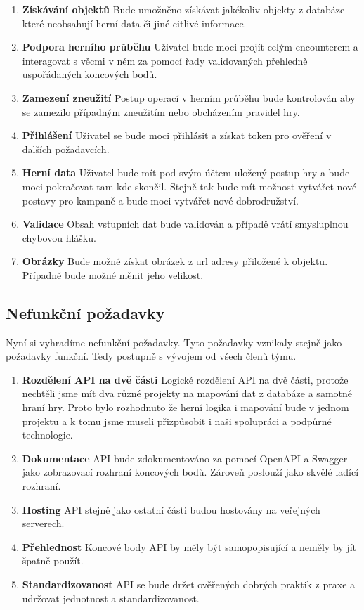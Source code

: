 \begin{enumerate}[label=\textbf{F\arabic*}:, leftmargin=*, align=left]
    \item \textbf{Získávání objektů} Bude umožněno získávat jakékoliv objekty z databáze které neobsahují herní data či jiné citlivé informace.
    \item \textbf{Podpora herního průběhu} Uživatel bude moci projít celým encounterem a interagovat s věcmi v něm za pomocí řady validovaných přehledně uspořádaných koncových bodů.
    \item \textbf{Zamezení zneužití} Postup operací v herním průběhu bude kontrolován aby se zamezilo případným zneužitím nebo obcházením pravidel hry.
    \item \textbf{Přihlášení} Uživatel se bude moci přihlásit a získat token pro ověření v dalších požadavcích.
    \item \textbf{Herní data} Uživatel bude mít pod svým účtem uložený postup hry a bude moci pokračovat tam kde skončil. Stejně tak bude mít možnost vytvářet nové postavy pro kampaně a bude moci vytvářet nové dobrodružství.
    \item \textbf{Validace} Obsah vstupních dat bude validován a případě vrátí smysluplnou chybovou hlášku.
    \item \textbf{Obrázky} Bude možné získat obrázek z url adresy přiložené k objektu. Případně bude možné měnit jeho velikost.
\end{enumerate}



\subsection{Nefunkční požadavky}
Nyní si vyhradíme nefunkční požadavky. Tyto požadavky vznikaly stejně jako požadavky funkční. Tedy postupně s vývojem od všech členů týmu.


\begin{enumerate}[label=\textbf{F\arabic*}:, leftmargin=*, align=left]
    \item \textbf{Rozdělení API na dvě části} Logické rozdělení API na dvě části, protože nechtěli jsme mít dva různé projekty na mapování dat z databáze a samotné hraní hry. Proto bylo rozhodnuto že herní logika i mapování bude v jednom projektu a k tomu jsme museli přizpůsobit i naši spolupráci a podpůrné technologie.
    \item \textbf{Dokumentace} API bude zdokumentováno za pomocí OpenAPI a Swagger jako zobrazovací rozhraní koncových bodů. Zároveň poslouží jako skvělé ladící rozhraní.
    \item \textbf{Hosting} API stejně jako ostatní části budou hostovány na veřejných serverech.
    \item \textbf{Přehlednost} Koncové body API by měly být samopopisující a neměly by jít špatně použít.
    \item \textbf{Standardizovanost} API se bude držet ověřených dobrých praktik z praxe a udržovat jednotnost a standardizovanost.
\end{enumerate}


